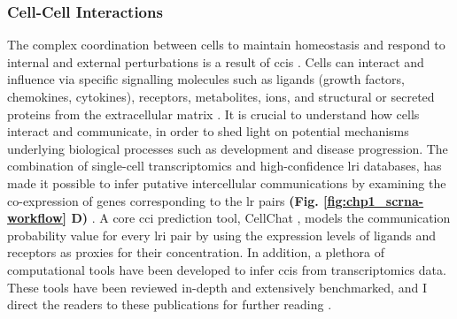 \subsubsection{Cell-Cell Interactions}
\par The complex coordination between cells to maintain homeostasis and respond to internal and external perturbations is a result of \glspl{cci} \textbf{\cite{armingol_deciphering_2021}}.  %
Cells can interact and influence via specific signalling molecules such as ligands (growth factors, chemokines, cytokines), receptors, metabolites, ions, and structural or secreted proteins from the extracellular matrix \textbf{\cite{armingol_deciphering_2021,armingol_diversification_2024}}. %
It is crucial to understand how cells interact and communicate, in order to shed light on potential mechanisms underlying biological processes such as development and disease progression. The combination of single-cell transcriptomics and high-confidence \gls{lri} databases, has made it possible to infer putative intercellular communications by examining the co-expression of genes corresponding to the \gls{lr} pairs \textbf{(Fig. \ref{fig:chp1_scrna-workflow} D)} \textbf{\cite{wilk_comparative_2023}}. A core \gls{cci} prediction tool, CellChat \textbf{\cite{jin_inference_2021}}, models the communication probability value for every \gls{lri} pair by using the expression levels of ligands and receptors as proxies for their concentration. In addition, a plethora of computational tools have been developed to infer \glspl{cci} from transcriptomics data. These tools have been reviewed in-depth and extensively benchmarked, and I direct the readers to these publications for further reading \textbf{\cite{armingol_deciphering_2021,armingol_diversification_2024,liu_evaluation_2022,xie_comparison_2023,cheng_review_2023}}.\\


